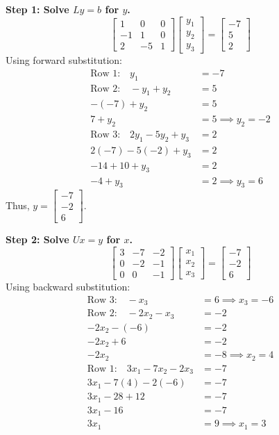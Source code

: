 \documentclass[11pt]{article}
\begin{document}
\textbf{Step 1: Solve $Ly = b$ for $y$.}
\[ \begin{bmatrix} 1 & 0 & 0 \\ -1 & 1 & 0 \\ 2 & -5 & 1 \end{bmatrix} \begin{bmatrix} y_1 \\ y_2 \\ y_3 \end{bmatrix} = \begin{bmatrix} -7 \\ 5 \\ 2 \end{bmatrix} \]
Using forward substitution:
\begin{align*}
    \text{Row 1:} \quad y_1 &= -7 \\
    \text{Row 2:} \quad -y_1 + y_2 &= 5 \\
    -(-7) + y_2 &= 5 \\
    7 + y_2 &= 5 \implies y_2 = -2 \\
    \text{Row 3:} \quad 2y_1 - 5y_2 + y_3 &= 2 \\
    2(-7) - 5(-2) + y_3 &= 2 \\
    -14 + 10 + y_3 &= 2 \\
    -4 + y_3 &= 2 \implies y_3 = 6
\end{align*}
Thus, $y = \begin{bmatrix} -7 \\ -2 \\ 6 \end{bmatrix}$.

\textbf{Step 2: Solve $Ux = y$ for $x$.}
\[ \begin{bmatrix} 3 & -7 & -2 \\ 0 & -2 & -1 \\ 0 & 0 & -1 \end{bmatrix} \begin{bmatrix} x_1 \\ x_2 \\ x_3 \end{bmatrix} = \begin{bmatrix} -7 \\ -2 \\ 6 \end{bmatrix} \]
Using backward substitution:
\begin{align*}
    \text{Row 3:} \quad -x_3 &= 6 \implies x_3 = -6 \\
    \text{Row 2:} \quad -2x_2 - x_3 &= -2 \\
    -2x_2 - (-6) &= -2 \\
    -2x_2 + 6 &= -2 \\
    -2x_2 &= -8 \implies x_2 = 4 \\
    \text{Row 1:} \quad 3x_1 - 7x_2 - 2x_3 &= -7 \\
    3x_1 - 7(4) - 2(-6) &= -7 \\
    3x_1 - 28 + 12 &= -7 \\
    3x_1 - 16 &= -7 \\
    3x_1 &= 9 \implies x_1 = 3
\end{align*}
\end{document}
